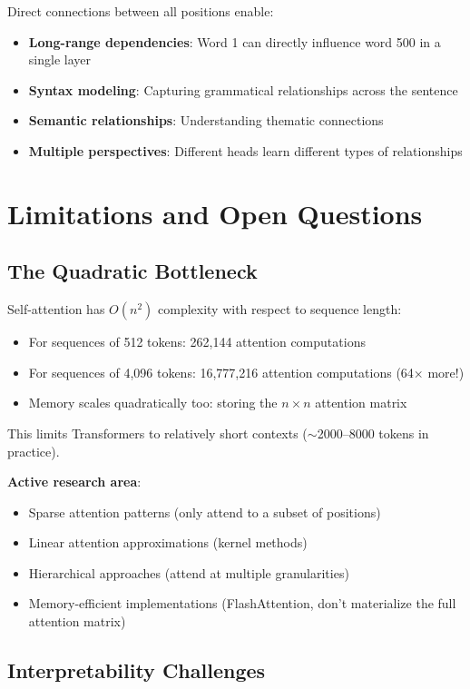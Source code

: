 \documentclass{article}
\begin{document}
Direct connections between all positions enable:
\begin{itemize}
\item \textbf{Long-range dependencies}: Word 1 can directly influence word 500 in a single layer
\item \textbf{Syntax modeling}: Capturing grammatical relationships across the sentence
\item \textbf{Semantic relationships}: Understanding thematic connections
\item \textbf{Multiple perspectives}: Different heads learn different types of relationships
\end{itemize}

\section{Limitations and Open Questions}

\subsection{The Quadratic Bottleneck}

Self-attention has $O(n^2)$ complexity with respect to sequence length:

\begin{itemize}
\item For sequences of 512 tokens: 262,144 attention computations
\item For sequences of 4,096 tokens: 16,777,216 attention computations (64$\times$ more!)
\item Memory scales quadratically too: storing the $n \times n$ attention matrix
\end{itemize}

This limits Transformers to relatively short contexts ($\sim$2000--8000 tokens in practice).

\textbf{Active research area}:
\begin{itemize}
\item Sparse attention patterns (only attend to a subset of positions)
\item Linear attention approximations (kernel methods)
\item Hierarchical approaches (attend at multiple granularities)
\item Memory-efficient implementations (FlashAttention, don't materialize the full attention matrix)
\end{itemize}

\subsection{Interpretability Challenges}
\end{document}
